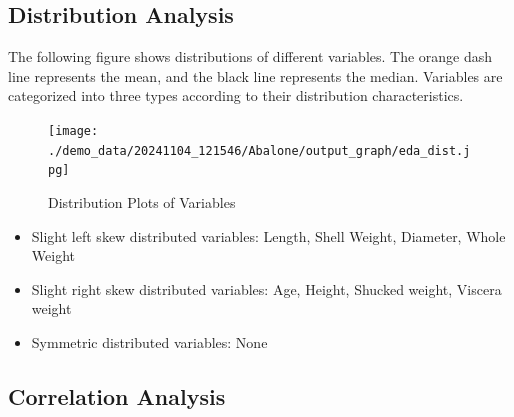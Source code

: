 \documentclass{article}
\begin{document}
\subsection{Distribution Analysis}
The following figure shows distributions of different variables. The orange dash line represents the mean, 
and the black line represents the median. Variables are categorized into three types according to their distribution characteristics.

\begin{figure}[H]
\centering
\texttt{[image: ./demo\_data/20241104\_121546/Abalone/output\_graph/eda\_dist.jpg]}
\caption{\label{fig:dist}Distribution Plots of Variables}
\end{figure}

\begin{itemize}
\item Slight left skew distributed variables: Length, Shell Weight, Diameter, Whole Weight
\item Slight right skew distributed variables: Age, Height, Shucked weight, Viscera weight
\item Symmetric distributed variables: None
\end{itemize}

\subsection{Correlation Analysis}
\end{document}
